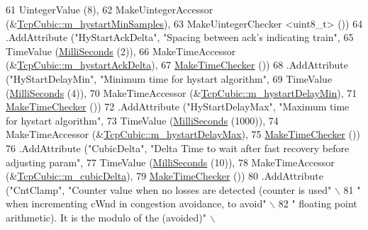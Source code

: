 \begin{DoxyCode}
61                    UintegerValue (8),
62                    MakeUintegerAccessor (&\hyperlink{classns3_1_1TcpCubic_ae86cb481bd166effae7227e90e9bafbb}{TcpCubic::m\_hystartMinSamples}),
63                    MakeUintegerChecker <uint8\_t> ())
64     .AddAttribute (\textcolor{stringliteral}{"HyStartAckDelta"}, \textcolor{stringliteral}{"Spacing between ack's indicating train"},
65                    TimeValue (\hyperlink{group__timecivil_gaf26127cf4571146b83a92ee18679c7a9}{MilliSeconds} (2)),
66                    MakeTimeAccessor (&\hyperlink{classns3_1_1TcpCubic_a8aa5da315009dabca1e8136de5e65015}{TcpCubic::m\_hystartAckDelta}),
67                    \hyperlink{group__time_ga7032965bd4afa578691d88c09e4481c1}{MakeTimeChecker} ())
68     .AddAttribute (\textcolor{stringliteral}{"HyStartDelayMin"}, \textcolor{stringliteral}{"Minimum time for hystart algorithm"},
69                    TimeValue (\hyperlink{group__timecivil_gaf26127cf4571146b83a92ee18679c7a9}{MilliSeconds} (4)),
70                    MakeTimeAccessor (&\hyperlink{classns3_1_1TcpCubic_a63dffc9a29dc6577a99c4046efcb01f0}{TcpCubic::m\_hystartDelayMin}),
71                    \hyperlink{group__time_ga7032965bd4afa578691d88c09e4481c1}{MakeTimeChecker} ())
72     .AddAttribute (\textcolor{stringliteral}{"HyStartDelayMax"}, \textcolor{stringliteral}{"Maximum time for hystart algorithm"},
73                    TimeValue (\hyperlink{group__timecivil_gaf26127cf4571146b83a92ee18679c7a9}{MilliSeconds} (1000)),
74                    MakeTimeAccessor (&\hyperlink{classns3_1_1TcpCubic_a1003aa1c760f12195ea62f0e86dbcfb4}{TcpCubic::m\_hystartDelayMax}),
75                    \hyperlink{group__time_ga7032965bd4afa578691d88c09e4481c1}{MakeTimeChecker} ())
76     .AddAttribute (\textcolor{stringliteral}{"CubicDelta"}, \textcolor{stringliteral}{"Delta Time to wait after fast recovery before adjusting param"},
77                    TimeValue (\hyperlink{group__timecivil_gaf26127cf4571146b83a92ee18679c7a9}{MilliSeconds} (10)),
78                    MakeTimeAccessor (&\hyperlink{classns3_1_1TcpCubic_a10b3b2aedb75eb85ecf5e339462def08}{TcpCubic::m\_cubicDelta}),
79                    \hyperlink{group__time_ga7032965bd4afa578691d88c09e4481c1}{MakeTimeChecker} ())
80     .AddAttribute (\textcolor{stringliteral}{"CntClamp"}, \textcolor{stringliteral}{"Counter value when no losses are detected (counter is used"} \(\backslash\)
81                    \textcolor{stringliteral}{" when incrementing cWnd in congestion avoidance, to avoid"} \(\backslash\)
82                    \textcolor{stringliteral}{" floating point arithmetic). It is the modulo of the (avoided)"} \(\backslash\)

\end{DoxyCode}
